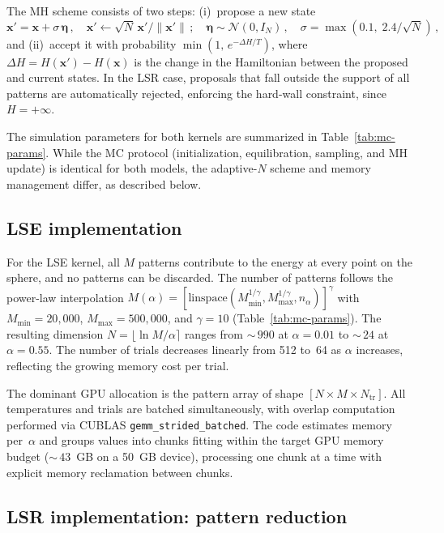 \documentclass[11pt]{article}
\begin{document}
The MH scheme consists of two steps: (i)~propose a new state
\begin{equation}
    \bm{x}' = \bm{x} + \sigma\,\bm{\eta}\,,\quad
    \bm{x}' \leftarrow \sqrt{N}\,\bm{x}'/\|\bm{x}'\|\,;\quad
    \bm{\eta} \sim \mathcal{N}(0, I_N)\,,\quad
    \sigma = \max(0.1,\; 2.4/\sqrt{N})\,,
\end{equation}
and (ii)~accept it with probability $\min(1,\, e^{-\Delta H / T})$, where $\Delta H = H(\bm{x}') - H(\bm{x})$ is the change in the Hamiltonian between the proposed and current states.
In the LSR case, proposals that fall outside the support of all patterns are automatically rejected, enforcing the hard-wall constraint, since $H = +\infty$.

The simulation parameters for both kernels are summarized in Table~\ref{tab:mc-params}. While the MC protocol (initialization, equilibration, sampling, and MH update) is identical for both models, the adaptive-$N$ scheme and memory management differ, as described below.

\subsection{LSE implementation}
\label{sec:mc-lse}

For the LSE kernel, all $M$ patterns contribute to the energy at every point on the sphere, and no patterns can be discarded.
The number of patterns follows the power-law interpolation $M(\alpha) = [\mathrm{linspace}(M_{\min}^{1/\gamma}, M_{\max}^{1/\gamma}, n_\alpha)]^\gamma$ with $M_{\min} = 20{,}000$, $M_{\max} = 500{,}000$, and $\gamma = 10$ (Table~\ref{tab:mc-params}).
The resulting dimension $N = \lfloor \ln M / \alpha \rceil$ ranges from ${\sim}\,990$ at $\alpha = 0.01$ to ${\sim}\,24$ at $\alpha = 0.55$.
The number of trials decreases linearly from 512 to~64 as $\alpha$ increases, reflecting the growing memory cost per trial.

The dominant GPU allocation is the pattern array of shape $[N \times M \times N_{\mathrm{tr}}]$.
All temperatures and trials are batched simultaneously, with overlap computation performed via CUBLAS \texttt{gemm\_strided\_batched}.
The code estimates memory per~$\alpha$ and groups values into chunks fitting within the target GPU memory budget (${\sim}\,43$~GB on a 50~GB device), processing one chunk at a time with explicit memory reclamation between chunks.

\subsection{LSR implementation: pattern reduction}
\label{sec:mc-lsr}
\end{document}
